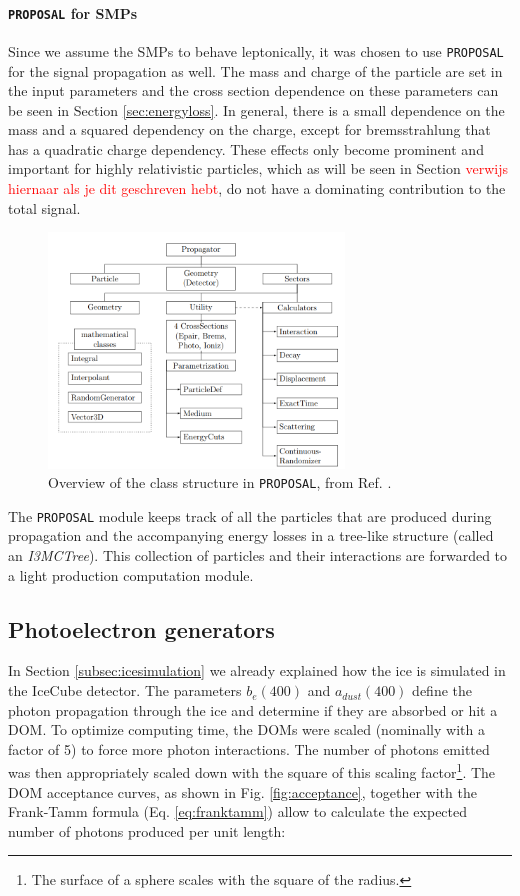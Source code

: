 \paragraph{\texttt{PROPOSAL} for SMPs}
Since we assume the SMPs to behave leptonically, it was chosen to use \texttt{PROPOSAL} for the signal propagation as well. The mass and charge of the particle are set in the input parameters and the cross section dependence on these parameters can be seen in Section \ref{sec:energyloss}. In general, there is a small dependence on the mass and a squared dependency on the charge, except for bremsstrahlung that has a quadratic charge dependency. These effects only become prominent and important for highly relativistic particles, which as will be seen in Section \textcolor{red}{verwijs hiernaar als je dit geschreven hebt}, do not have a dominating contribution to the total signal.\\

\begin{figure}
\centering
\includegraphics[width=0.7\textwidth]{chapter6/img/proposal.png}
\caption{Overview of the class structure in \texttt{PROPOSAL}, from Ref. \cite{Dunsch:2018nsc}.}
\label{fig:proposal}
\end{figure}

\noindent The \texttt{PROPOSAL} module keeps track of all the particles that are produced during propagation and the accompanying energy losses in a tree-like structure (called an \textit{I3MCTree}). This collection of particles and their interactions are forwarded to a light production computation module.

\subsection{Photoelectron generators}
In Section \ref{subsec:icesimulation} we already explained how the ice is simulated in the IceCube detector. The parameters $b_e(400)$ and $a_{dust}(400)$ define the photon propagation through the ice and determine if they are absorbed or hit a DOM. To optimize computing time, the DOMs were scaled (nominally with a factor of 5) to force more photon interactions. The number of photons emitted was then appropriately scaled down with the square of this scaling factor\footnote{The surface of a sphere scales with the square of the radius.}. The DOM acceptance curves, as shown in Fig. \ref{fig:acceptance}, together with the Frank-Tamm formula (Eq. \ref{eq:franktamm}) allow to calculate the expected number of photons produced per unit length:

